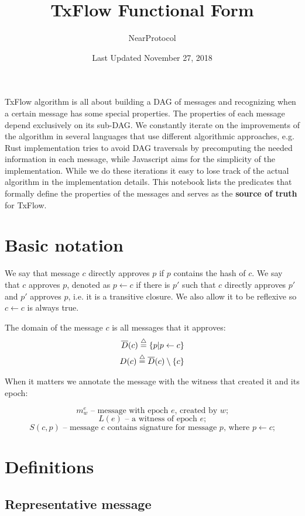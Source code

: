 \documentclass{article}
\title{TxFlow Functional Form}
\author{NearProtocol}
\date{Last Updated November 27, 2018}
\begin{document}
\maketitle

TxFlow algorithm is all about building a DAG of messages and recognizing when a certain message has some special properties. The properties of each message depend exclusively on its sub-DAG. We constantly iterate on the improvements of the algorithm in several languages that use different algorithmic approaches, e.g. Rust implementation tries to avoid DAG traversals by precomputing the needed information in each message, while Javascript aims for the simplicity of the implementation. While we do these iterations it easy to lose track of the actual algorithm in the implementation details. This notebook lists the predicates that formally define the properties of the messages and serves as the \textbf{source of truth} for TxFlow.

\section*{Basic notation}
We say that message $c$ directly approves $p$ if $p$ contains the hash of $c$. We say that $c$ approves $p$, denoted as $p\leftarrow c$ if there is $p'$ such that $c$ directly approves $p'$ and $p'$ approves $p$, i.e. it is a transitive closure. We also allow it to be reflexive so $c\leftarrow c$ is always true.

The domain of the message $c$ is all messages that it approves:
\[
\begin{aligned}
\overline{D}(c) \buildrel\triangle\over = \{p|p\leftarrow c\} \\
D(c) \buildrel\triangle\over = \overline{D}(c)\setminus\{c\}
\end{aligned}
\]

When it matters we annotate the message with the witness that created it and its epoch:

\[m_w^e \text{ -- message with epoch $e$, created by $w$;} \]
\[L(e) \text{ -- a witness of epoch $e$;} \]
\[S(c, p) \text{ -- message $c$ contains signature for message $p$, where $p\leftarrow c$;}\]

\section*{Definitions}
\subsection*{Representative message}
\end{document}
